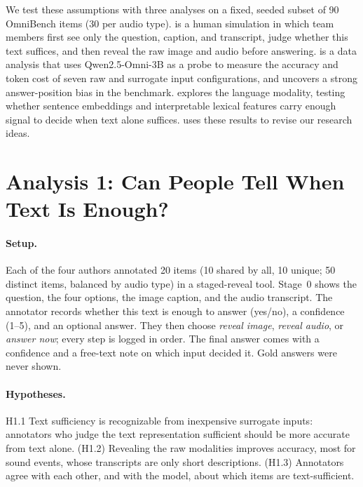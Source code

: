 \documentclass{article}
\begin{document}
We test these assumptions with three analyses on a fixed, seeded subset of 90
OmniBench items (30 per audio type).  is a human simulation in
which team members first see only the question, caption, and transcript, judge
whether this text suffices, and then reveal the raw image and audio before
answering.  is a data analysis that uses Qwen2.5-Omni-3B
\citep{xu2025qwen25omni} as a probe to measure the accuracy and token cost of
seven raw and surrogate input configurations, and uncovers a strong
answer-position bias in the benchmark.  explores the language
modality, testing whether sentence embeddings and interpretable lexical
features carry enough signal to decide when text alone suffices.
 uses these results to revise our research ideas.

\section{Analysis 1: Can People Tell When Text Is Enough?}
\label{sec:a1}

\paragraph{Setup.} Each of the four authors annotated 20 items (10 shared by
all, 10 unique; 50 distinct items, balanced by audio type) in a staged-reveal
tool. Stage~0 shows the question, the four options, the image caption, and the
audio transcript. The annotator records whether this text is enough to answer
(yes/no), a confidence (1--5), and an optional answer. They then choose
\emph{reveal image}, \emph{reveal audio}, or \emph{answer now}; every step is
logged in order. The final answer comes with a confidence and a free-text note
on which input decided it. Gold answers were never shown.

\paragraph{Hypotheses.} H1.1 Text sufficiency is recognizable from inexpensive surrogate inputs: annotators who judge the text representation sufficient should be more accurate from text alone. (H1.2) Revealing
the raw modalities improves accuracy, most for sound events, whose transcripts
are only short descriptions. (H1.3) Annotators agree with each other, and with
the model, about which items are text-sufficient.
\end{document}
